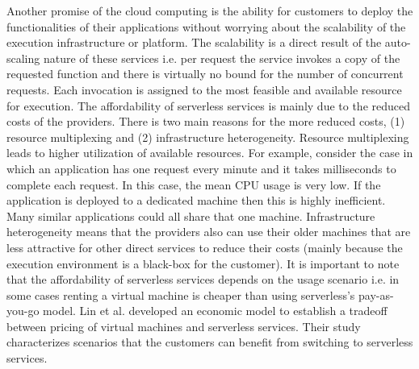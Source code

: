 Another promise of the cloud computing is the ability for customers to deploy the functionalities of their applications without worrying about the scalability of the execution infrastructure or platform. The scalability is a direct result of the auto-scaling nature of these services i.e. per request the service invokes a copy of the requested function and there is virtually no bound for the number of concurrent requests. Each invocation is assigned to the most feasible and available resource for execution.
The affordability of serverless services is mainly due to the reduced costs of the providers. There is two main reasons for the more reduced costs, (1) resource multiplexing and (2) infrastructure heterogeneity. Resource multiplexing leads to higher utilization of available resources. For example, consider the case in which an application has one request every minute and it takes milliseconds to complete each request. In this case, the mean CPU usage is very low. If the application is deployed to a dedicated machine then this is highly inefficient. Many similar applications could all share that one machine. Infrastructure heterogeneity means that the providers also can use their older machines that are less attractive for other direct services to reduce their costs (mainly because the execution environment is a black-box for the customer).
It is important to note that the affordability of serverless services depends on the usage scenario i.e. in some cases renting a virtual machine is cheaper than using serverless's pay-as-you-go model. Lin et al.  developed an economic model to establish a tradeoff between pricing of virtual machines and serverless services. Their study characterizes scenarios that the customers can benefit from switching to serverless services.

